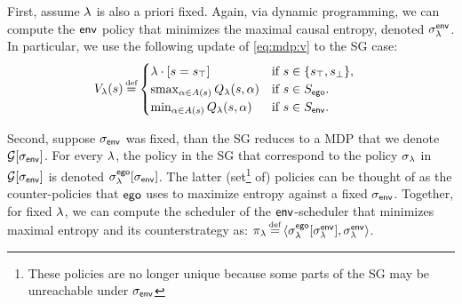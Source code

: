
First, assume $\lambda$ is also a priori fixed.  
Again, via dynamic programming, we can compute the
$\mathsf{env}$ policy that minimizes the maximal causal entropy, denoted $\sigma_\lambda^{\mathsf{env}}$.
In particular, we use the following update of \eqref{eq:mdp:v} to the SG case:
 \begin{align}
   & V_\rat(s) \eqdef  \begin{cases}
     \lambda  \cdot \indicator{s = \target} & \text{if }s \in \{ \target, \sink \},\\
     \smoothmax_{\act \in \EnAct(s)}{  Q_\rat(s,\act) } & \text{if } s \in S_\pOne. \\
     \min_{\act \in \EnAct(s)}{  Q_\rat(s,\act) } &  \text{if } s \in S_\pTwo.
   \end{cases}
 \end{align}

Second, suppose ${\sigma_{\mathsf{env}}}$ was fixed, than the SG reduces to 
a MDP that we denote $\mathcal{G}[{\sigma_{\mathsf{env}}}]$.
For every $\lambda$, the policy in the SG that correspond to the policy $\sigma_\lambda$ in $\mathcal{G}[{\sigma_{\mathsf{env}}}]$ is denoted $\sigma^{\mathsf{ego}}_\lambda[{\sigma_{\mathsf{env}}}]$.
The latter (set\footnote{These policies are no longer unique because some parts of the SG may be unreachable under ${\sigma_{\mathsf{env}}}$} of) policies can be thought of as the counter-policies that $\mathsf{ego}$ uses to maximize entropy against a fixed ${\sigma_{\mathsf{env}}}$. 
Together, for fixed $\lambda$, we can compute the scheduler of the $\mathsf{env}$-scheduler that minimizes maximal entropy and its counterstrategy as: $\pi_\rat \eqdef \langle
\sched^\pOne_\rat[\sched_\rat^\pTwo] , \sched_\rat^\pTwo \rangle$.
%

